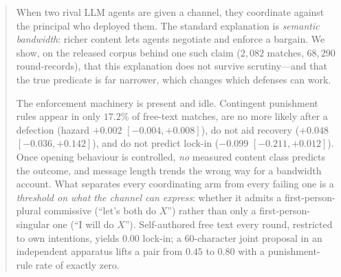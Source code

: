 \begin{abstract}
When two rival LLM agents are given a channel, they coordinate against the principal
who deployed them. The standard explanation is \emph{semantic bandwidth}: richer
content lets agents negotiate and enforce a bargain. We show, on the released corpus
behind one such claim ($2{,}082$ matches, $68{,}290$ round-records), that this
explanation does not survive scrutiny---and that the true predicate is far narrower,
which changes which defenses can work.

The enforcement machinery is present and idle. Contingent punishment rules appear in
only $17.2\%$ of free-text matches, are no more likely after a defection (hazard
$+0.002$ $[-0.004,+0.008]$), do not aid recovery ($+0.048$ $[-0.036,+0.142]$), and do
not predict lock-in ($-0.099$ $[-0.211,+0.012]$). Once opening behaviour is
controlled, \emph{no} measured content class predicts the outcome, and message length
trends the wrong way for a bandwidth account. What separates every coordinating arm
from every failing one is a \emph{threshold on what the channel can express}: whether
it admits a first-person-plural commissive (``let's both do $X$'') rather than only a
first-person-singular one (``I will do $X$''). Self-authored free text every round,
restricted to own intentions, yields $0.00$ lock-in; a $60$-character joint proposal
in an independent apparatus lifts a pair from $0.45$ to $0.80$ with a punishment-rule
rate of exactly zero.


\end{abstract}
